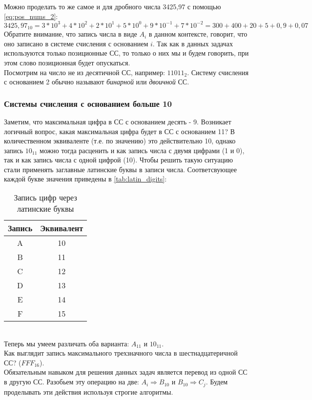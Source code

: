 \documentclass[12pt]{article}
\theoremstyle{problem_style}
\begin{document}
Можно проделать то же самое и для дробного числа 3425,97 с помощью \autoref{eq:pos_nums_2}:
\[
3425,97_{10} = 3 * 10^3 + 4 * 10^2 + 2 * 10^1 + 5 * 10^0 + 9 * 10^{-1} + 7 * 10^{-2} = 300 + 400 + 20 + 5 + 0,9 + 0,07
\]
Обратите внимание, что запись числа в виде $A_i$ в данном контексте, говорит, что оно записано в системе счисления с основанием $i$. Так как в данных задачах используются только позиционные СС, то только о них мы и будем говорить, при этом слово позиционная будет опускаться.\\
Посмотрим на число не из десятичной СС, например: $11011_2$. Систему счисления с основанием 2 обычно называют \textit{бинарной} или \textit{двоичной} СС.
\subsubsection{Системы счисления с основанием больше 10}
Заметим, что максимальная цифра в СС с основанием десять - 9. Возникает логичный вопрос, какая максимальная цифра будет в СС с основанием 11? В количественном эквиваленте (т.е. по значению) это действительно 10, однако запись $10_{11}$ можно тогда расценить и как запись числа с двумя цифрами (1 и 0), так и как запись числа с одной цифрой (10). Чтобы решить такую ситуацию стали применять заглавные латинские буквы в записи числа. Соответсвующее каждой букве значения приведены в \autoref{tab:latin_digits}:
\begin{table}[!h]
    \centering
    \begin{tabular}{c|c}
        Запись & Эквивалент \\ \hline
        A & 10 \\
        B & 11 \\
        C & 12 \\
        D & 13 \\
        E & 14 \\
        F & 15 \\
    \end{tabular}
    \caption{Запись цифр через латинские буквы}
    \label{tab:latin_digits}
\end{table}\\
Теперь мы умеем различать оба варианта: $A_{11}$ и $10_{11}$. \\
Как выглядит запись максимального трехзначного числа в шестнадцатеричной СС? ($FFF_{16}$).\\
Обязательным навыком для решения данных задач является перевод из одной СС в другую СС. Разобьем 
эту операцию на две: $A_i \Rightarrow B_{10}$ и $B_{10} \Rightarrow C_j$. Будем проделывать эти действия используя строгие алгоритмы.
\end{document}

